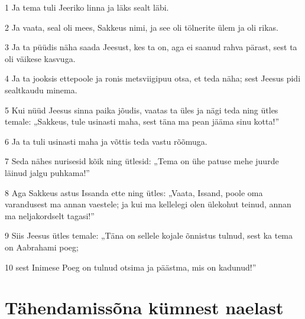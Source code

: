 \par 1 Ja tema tuli Jeeriko linna ja läks sealt läbi.
\par 2 Ja vaata, seal oli mees, Sakkeus nimi, ja see oli tölnerite ülem ja oli rikas.
\par 3 Ja ta püüdis näha saada Jeesust, kes ta on, aga ei saanud rahva pärast, sest ta oli väikese kasvuga.
\par 4 Ja ta jooksis ettepoole ja ronis metsviigipuu otsa, et teda näha; sest Jeesus pidi sealtkaudu minema.
\par 5 Kui nüüd Jeesus sinna paika jõudis, vaatas ta üles ja nägi teda ning ütles temale: „Sakkeus, tule usinasti maha, sest täna ma pean jääma sinu kotta!”
\par 6 Ja ta tuli usinasti maha ja võttis teda vastu rõõmuga.
\par 7 Seda nähes nurisesid kõik ning ütlesid: „Tema on ühe patuse mehe juurde läinud jalgu puhkama!”
\par 8 Aga Sakkeus astus Issanda ette ning ütles: „Vaata, Issand, poole oma varandusest ma annan vaestele; ja kui ma kellelegi olen ülekohut teinud, annan ma neljakordselt tagasi!”
\par 9 Siis Jeesus ütles temale: „Täna on sellele kojale õnnistus tulnud, sest ka tema on Aabrahami poeg;
\par 10 sest Inimese Poeg on tulnud otsima ja päästma, mis on kadunud!”

\section*{Tähendamissõna kümnest naelast}

